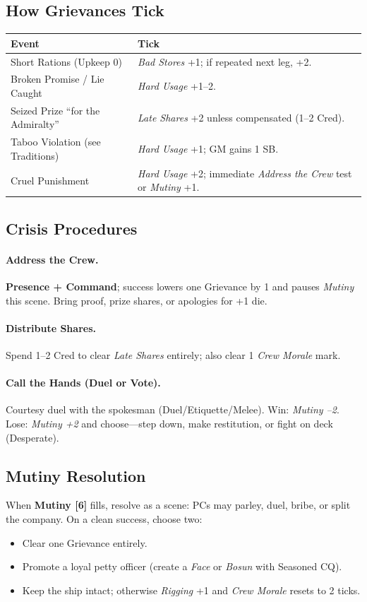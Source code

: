 \documentclass[11pt,oneside]{book}
\begin{document}
\subsection*{How Grievances Tick}
\begin{tabularx}{\linewidth}{@{}p{3.6cm} X@{}}
\toprule
\textbf{Event} & \textbf{Tick}\\
\midrule
Short Rations (Upkeep 0) & \textit{Bad Stores} +1; if repeated next leg, +2.\\
Broken Promise / Lie Caught & \textit{Hard Usage} +1--2.\\
Seized Prize ``for the Admiralty'' & \textit{Late Shares} +2 unless compensated (1--2 Cred).\\
Taboo Violation (see Traditions) & \textit{Hard Usage} +1; GM gains 1 SB.\\
Cruel Punishment & \textit{Hard Usage} +2; immediate \emph{Address the Crew} test or \textit{Mutiny} +1.\\
\bottomrule
\end{tabularx}

\subsection*{Crisis Procedures}
\paragraph{Address the Crew.} \textbf{Presence + Command}; success lowers one Grievance by 1 and pauses \textit{Mutiny} this scene. Bring proof, prize shares, or apologies for +1 die.
\paragraph{Distribute Shares.} Spend 1--2 Cred to clear \textit{Late Shares} entirely; also clear 1 \textit{Crew Morale} mark.
\paragraph{Call the Hands (Duel or Vote).} Courtesy duel with the spokesman (Duel/Etiquette/Melee). Win: \textit{Mutiny --2}. Lose: \textit{Mutiny +2} and choose---step down, make restitution, or fight on deck (Desperate).

\subsection*{Mutiny Resolution}
When \textbf{Mutiny [6]} fills, resolve as a scene: PCs may parley, duel, bribe, or split the company. On a clean success, choose two:
\begin{itemize}
  \item Clear one Grievance entirely.
  \item Promote a loyal petty officer (create a \emph{Face} or \emph{Bosun} with Seasoned CQ).
  \item Keep the ship intact; otherwise \textit{Rigging} +1 and \textit{Crew Morale} resets to 2 ticks.
\end{itemize}
\end{document}
